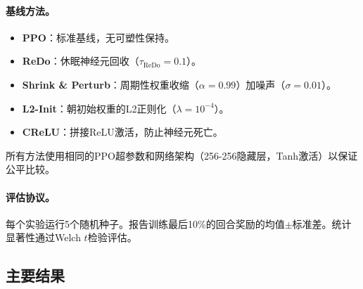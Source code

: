 \documentclass[twocolumn]{article}
\begin{document}
\paragraph{基线方法。}
\begin{itemize}[leftmargin=*]
    \item \textbf{PPO}\cite{schulman2017ppo}：标准基线，无可塑性保持。
    \item \textbf{ReDo}\cite{sokar2023dormant}：休眠神经元回收（$\tau_{\text{ReDo}} = 0.1$）。
    \item \textbf{Shrink \& Perturb}\cite{ash2020warm}：周期性权重收缩（$\alpha=0.99$）加噪声（$\sigma=0.01$）。
    \item \textbf{L2-Init}\cite{kumar2023maintaining}：朝初始权重的L2正则化（$\lambda = 10^{-4}$）。
    \item \textbf{CReLU}\cite{abbas2023loss}：拼接ReLU激活，防止神经元死亡。
\end{itemize}
所有方法使用相同的PPO超参数和网络架构（256-256隐藏层，Tanh激活）以保证公平比较。

\paragraph{评估协议。}
每个实验运行5个随机种子。报告训练最后10\%的回合奖励的均值$\pm$标准差。统计显著性通过Welch $t$检验评估。


\subsection{主要结果}
\end{document}
